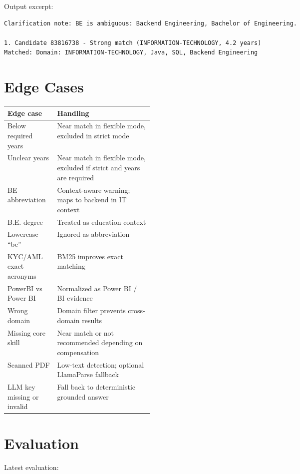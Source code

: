 \documentclass[11pt]{article}
\begin{document}
Output excerpt:

\begin{lstlisting}
Clarification note: BE is ambiguous: Backend Engineering, Bachelor of Engineering.

1. Candidate 83816738 - Strong match (INFORMATION-TECHNOLOGY, 4.2 years)
Matched: Domain: INFORMATION-TECHNOLOGY, Java, SQL, Backend Engineering
\end{lstlisting}

\section{Edge Cases}

\begin{center}
\begin{tabularx}{\linewidth}{|p{0.34\linewidth}|Y|}
\hline
\textbf{Edge case} & \textbf{Handling} \\
\hline
Below required years & Near match in flexible mode, excluded in strict mode \\
\hline
Unclear years & Near match in flexible mode, excluded if strict and years are required \\
\hline
BE abbreviation & Context-aware warning; maps to backend in IT context \\
\hline
B.E. degree & Treated as education context \\
\hline
Lowercase ``be'' & Ignored as abbreviation \\
\hline
KYC/AML exact acronyms & BM25 improves exact matching \\
\hline
PowerBI vs Power BI & Normalized as Power BI / BI evidence \\
\hline
Wrong domain & Domain filter prevents cross-domain results \\
\hline
Missing core skill & Near match or not recommended depending on compensation \\
\hline
Scanned PDF & Low-text detection; optional LlamaParse fallback \\
\hline
LLM key missing or invalid & Fall back to deterministic grounded answer \\
\hline
\end{tabularx}
\end{center}

\section{Evaluation}

Latest evaluation:
\end{document}

